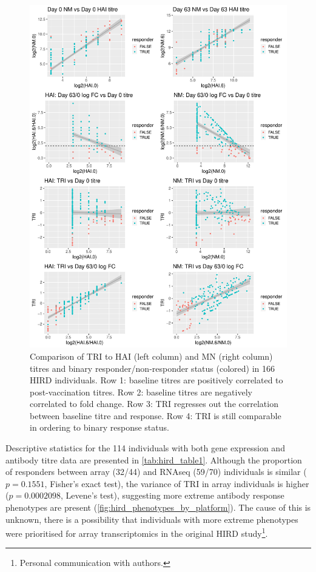 \begin{figure}
    \includegraphics[width=1.0\textwidth]{mainmatter/figures/chapter_02/phenotype_data_setup.tri_comparison.pdf}
    \caption{Comparison of \gls{TRI} to \gls{HAI} (left column) and \gls{MN} (right column) titres and binary responder/non-responder status (colored) in 166 \gls{HIRD} individuals. Row 1: baseline titres are positively correlated to post-vaccination titres. Row 2: baseline titres are negatively correlated to fold change. Row 3: \gls{TRI} regresses out the correlation between baseline titre and response. Row 4: \gls{TRI} is still comparable in ordering to binary response status.}
    \label{fig:hird_tri}
\end{figure} 

Descriptive statistics for the 114 individuals with both gene expression and antibody titre data are presented in \autoref{tab:hird_table1}.
Although the proportion of responders between array (32/44) and \gls{RNAseq} (59/70) individuals is similar ($p = 0.1551$, Fisher's exact test), the variance of \gls{TRI} in array individuals is higher ($p = 0.0002098$, Levene's test), suggesting more extreme antibody response phenotypes are present (\autoref{fig:hird_phenotypes_by_platform}).
The cause of this is unknown, there is a possibility that individuals with more extreme phenotypes were prioritised for array transcriptomics in the original \gls{HIRD} study\footnote{Personal communication with authors.}.

